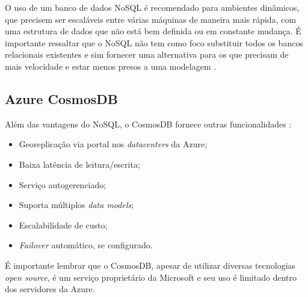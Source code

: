 \documentclass[12pt]{article}
\begin{document}
O uso de um banco de dados NoSQL é recomendado para ambientes dinâmicos, que precisem ser escaláveis entre várias máquinas de maneira mais rápida, com uma estrutura de dados que não está bem 
definida ou em constante mudança. É importante ressaltar que o NoSQL não tem como foco substituir todos os bancos relacionais existentes e sim fornecer uma alternativa para os que 
precisam de mais velocidade e estar menos presos a uma modelagem \cite{Oliveira2011} \cite{Lith2010} \cite{Leavitt2010}. 

\subsection{Azure CosmosDB}
Além das vantagens do NoSQL, o CosmosDB fornece outras funcionalidades \cite{Paz2018}:

\begin{itemize}
	\item Georeplicação via portal nos \textit{datacenters} da Azure;
	\item Baixa latência de leitura/escrita;
	\item Serviço autogerenciado;
	\item Suporta múltiplos \textit{data models};
	\item Escalabilidade de custo;
	\item \textit{Failover} automático, se configurado.
\end{itemize}

É importante lembrar que o CosmosDB, apesar de utilizar diversas tecnologias \textit{open source}, é um serviço proprietário da Microsoft e seu uso é limitado dentro dos 
servidores da Azure.


\end{document}
